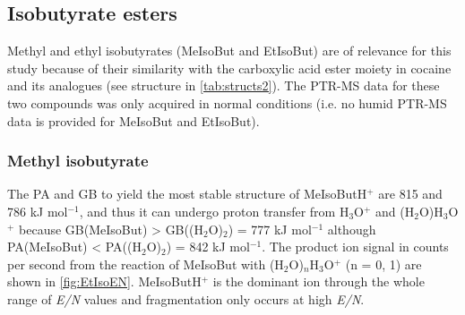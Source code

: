 



\subsection{Isobutyrate esters}
Methyl and ethyl isobutyrates (MeIsoBut and EtIsoBut) are of relevance for this study because of their similarity with the carboxylic acid ester moiety in cocaine and its analogues (see structure in \autoref{tab:structs2}).
%
The PTR-MS data for these two compounds was only acquired in normal conditions (i.e. no humid PTR-MS data is provided for MeIsoBut and EtIsoBut).


\subsubsection{Methyl isobutyrate}

The PA and GB to yield the most stable structure of MeIsoButH$^+$ are 815 and 786 kJ mol$^{-1}$, and thus it can undergo proton transfer from H$_3$O$^+$ and (H$_2$O)H$_3$O$^+$ 
because GB(MeIsoBut) > GB((H$_2$O)$_2$) = 777 kJ mol$^{-1}$ although 
PA(MeIsoBut) < PA((H$_2$O)$_2$) = 842 kJ mol$^{-1}$.
%
The product ion signal in counts per second from the reaction of MeIsoBut with (H$_2$O)$_n$H$_3$O$^+$ (n = 0, 1) are shown in \autoref{fig:EtIsoEN}. 
%
MeIsoButH$^+$ is the dominant ion through the whole range of \textit{E/N} values and fragmentation only occurs at high \textit{E/N}.
%

